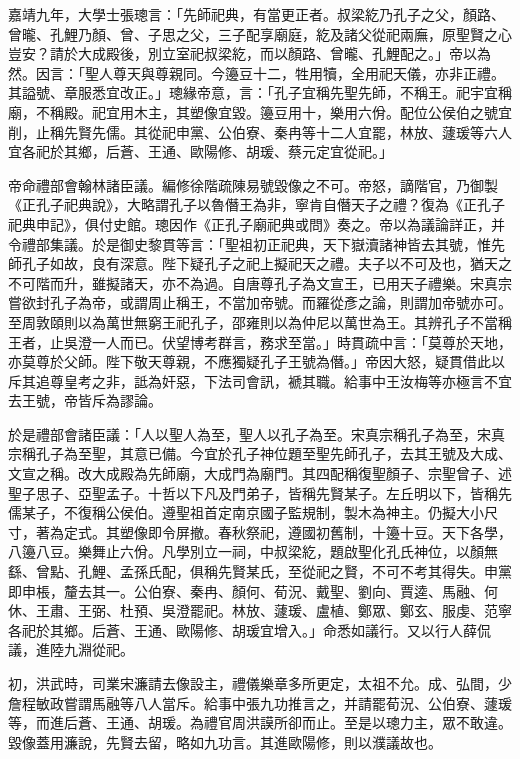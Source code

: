 嘉靖九年，大學士張璁言：「先師祀典，有當更正者。叔梁紇乃孔子之父，顏路、曾曨、孔鯉乃顏、曾、子思之父，三子配享廟庭，紇及諸父從祀兩廡，原聖賢之心豈安？請於大成殿後，別立室祀叔梁紇，而以顏路、曾曨、孔鯉配之。」帝以為然。因言：「聖人尊天與尊親同。今籩豆十二，牲用犢，全用祀天儀，亦非正禮。其謚號、章服悉宜改正。」璁緣帝意，言：「孔子宜稱先聖先師，不稱王。祀宇宜稱廟，不稱殿。祀宜用木主，其塑像宜毀。籩豆用十，樂用六佾。配位公侯伯之號宜削，止稱先賢先儒。其從祀申黨、公伯寮、秦冉等十二人宜罷，林放、蘧瑗等六人宜各祀於其鄉，后蒼、王通、歐陽修、胡瑗、蔡元定宜從祀。」

帝命禮部會翰林諸臣議。編修徐階疏陳易號毀像之不可。帝怒，謫階官，乃御製《正孔子祀典說》，大略謂孔子以魯僭王為非，寧肯自僭天子之禮？復為《正孔子祀典申記》，俱付史館。璁因作《正孔子廟祀典或問》奏之。帝以為議論詳正，并令禮部集議。於是御史黎貫等言：「聖祖初正祀典，天下嶽瀆諸神皆去其號，惟先師孔子如故，良有深意。陛下疑孔子之祀上擬祀天之禮。夫子以不可及也，猶天之不可階而升，雖擬諸天，亦不為過。自唐尊孔子為文宣王，已用天子禮樂。宋真宗嘗欲封孔子為帝，或謂周止稱王，不當加帝號。而羅從彥之論，則謂加帝號亦可。至周敦頤則以為萬世無窮王祀孔子，邵雍則以為仲尼以萬世為王。其辨孔子不當稱王者，止吳澄一人而已。伏望博考群言，務求至當。」時貫疏中言：「莫尊於天地，亦莫尊於父師。陛下敬天尊親，不應獨疑孔子王號為僭。」帝因大怒，疑貫借此以斥其追尊皇考之非，詆為奸惡，下法司會訊，褫其職。給事中王汝梅等亦極言不宜去王號，帝皆斥為謬論。

於是禮部會諸臣議：「人以聖人為至，聖人以孔子為至。宋真宗稱孔子為至，宋真宗稱孔子為至聖，其意已備。今宜於孔子神位題至聖先師孔子，去其王號及大成、文宣之稱。改大成殿為先師廟，大成門為廟門。其四配稱復聖顏子、宗聖曾子、述聖子思子、亞聖孟子。十哲以下凡及門弟子，皆稱先賢某子。左丘明以下，皆稱先儒某子，不復稱公侯伯。遵聖祖首定南京國子監規制，製木為神主。仍擬大小尺寸，著為定式。其塑像即令屏撤。春秋祭祀，遵國初舊制，十籩十豆。天下各學，八籩八豆。樂舞止六佾。凡學別立一祠，中叔梁紇，題啟聖化孔氏神位，以顏無繇、曾點、孔鯉、孟孫氏配，俱稱先賢某氏，至從祀之賢，不可不考其得失。申黨即申棖，釐去其一。公伯寮、秦冉、顏何、荀況、戴聖、劉向、賈逵、馬融、何休、王肅、王弼、杜預、吳澄罷祀。林放、蘧瑗、盧植、鄭眾、鄭玄、服虔、范寧各祀於其鄉。后蒼、王通、歐陽修、胡瑗宜增入。」命悉如議行。又以行人薛侃議，進陸九淵從祀。

初，洪武時，司業宋濂請去像設主，禮儀樂章多所更定，太祖不允。成、弘間，少詹程敏政嘗謂馬融等八人當斥。給事中張九功推言之，并請罷荀況、公伯寮、蘧瑗等，而進后蒼、王通、胡瑗。為禮官周洪謨所卻而止。至是以璁力主，眾不敢違。毀像蓋用濂說，先賢去留，略如九功言。其進歐陽修，則以濮議故也。

